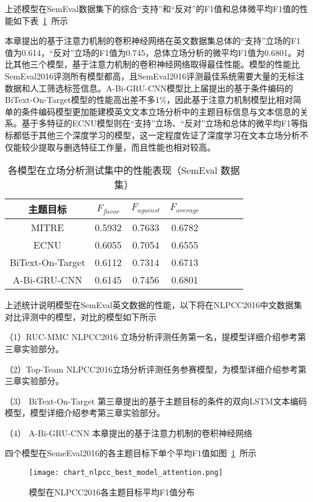上述模型在SemEval数据集下的综合“支持”和“反对”的F1值和总体微平均F1值的性能如下表~\ref{semeval_attention_res}~所示


本章提出的基于注意力机制的卷积神经网络在英文数据集总体的“支持”立场的F1值为0.614，“反对”立场的F1值为0.745，总体立场分析的微平均F1值为0.6801。对比其他三个模型，基于注意力机制的卷积神经网络取得最佳性能。模型的性能比SemEval2016评测所有模型都高，且SemEval2016评测最佳系统需要大量的无标注数据和人工筛选标签信息。A-Bi-GRU-CNN模型比上届提出的基于条件编码的BiText-On-Target模型的性能高出差不多1\%，因此基于注意力机制模型比相对简单的条件编码模型更加能建模英文文本立场分析中的主题目标信息与文本信息的关系。基于多特征的ECNU模型则在“支持”立场、“反对”立场和总体的微平均F1等指标都低于其他三个深度学习的模型，这一定程度佐证了深度学习在文本立场分析不仅能较少提取与删选特征工作量，而且性能也相对较高。

\begin{table}[htbp]
	\caption[table123]{各模型在立场分析测试集中的性能表现（SemEval 数据集）}
	\vspace{0.5em}\centering\wuhao
	\label{semeval_attention_res}
	\begin{tabular}{cccccccc}
		\toprule[1.5pt]
		主题目标& $F_{favor}$&$F_{against}$&$F_{average}$ \\
		\midrule[1pt]
		MITRE&0.5932&0.7633&0.6782\\
		ECNU&0.6055&0.7054&0.6555\\
		BiText-On-Target&0.6112&0.7314&0.6713\\
			A-Bi-GRU-CNN&0.6145&0.7456&0.6801\\
		\bottomrule[1.5pt]
	\end{tabular}
\end{table}

上述统计说明模型在SemEval英文数据的性能，以下将在NLPCC2016中文数据集对比评测中的模型，对比的模型如下所示

（1）RUC-MMC NLPCC2016 立场分析评测任务第一名，提模型详细介绍参考第三章实验部分。

（2）Top-Team NLPCC2016立场分析评测任务参赛模型，为模型详细介绍参考第三章实验部分。

（3） BiText-On-Target 第三章提出的基于主题目标的条件的双向LSTM文本编码模型，模型详细介绍参考第三章实验部分。

（4） A-Bi-GRU-CNN 本章提出的基于注意力机制的卷积神经网络

四个模型在SemeEval2016的各主题目标下单个平均F1值如图~\ref{chart_nlpcc_best_model_attention}~所示
\begin{figure}[htbp]
	\centering
	\texttt{[image: chart\_nlpcc\_best\_model\_attention.png]}
	\caption[rnn_vanish]{模型在NLPCC2016各主题目标平均F1值分布}
	\label{chart_nlpcc_best_model_attention}
\end{figure}


